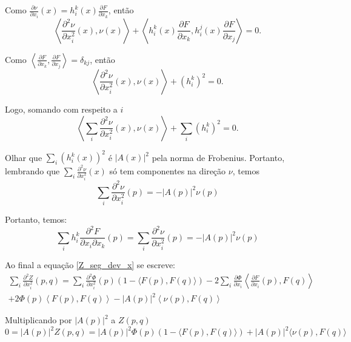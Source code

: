 \begin{demonstracao}
	Como $\frac{\partial \nu}{\partial x_i}(x) = h_i^k(x) \frac{\partial F}{\partial x_k}$, então
	\begin{equation*}
		\left\langle \frac{\partial^2 \nu}{\partial x_i^2}(x), \nu(x) \right\rangle + \left\langle h_i^k(x) \frac{\partial F}{\partial x_k}, h_i^j(x) \frac{\partial F}{\partial x_j}  \right\rangle = 0.
	\end{equation*}
	
	Como $\left\langle \frac{\partial F}{\partial x_k}, \frac{\partial F}{\partial x_j} \right\rangle = \delta_{kj}$, então
	\begin{equation*}
		\left\langle \frac{\partial^2 \nu}{\partial x_i^2}(x), \nu(x) \right\rangle + (h_i^k)^2 = 0.
	\end{equation*}
	
	Logo, somando com respeito a $i$
	\begin{equation*}
		\left\langle \sum_i \frac{\partial^2 \nu}{\partial x_i^2}(x), \nu(x) \right\rangle + \sum_i (h_i^k)^2 = 0.
	\end{equation*}
	
	Olhar que $\sum_i (h_i^k(x))^2$ é $| A(x) |^2$ pela norma de Frobenius. Portanto, lembrando que $\sum_i \frac{\partial^2 \nu}{\partial x_i^2}(x)$ só tem componentes na direção $\nu$, temos
	\begin{equation*}
		\sum_i \frac{\partial^2 \nu}{\partial x_i^2}(p) = - | A(p) |^2 \nu(p)
	\end{equation*}
	
	Portanto, temos:
	\begin{equation*}
		\sum_i h_i^k \frac{\partial^2 F}{\partial x_i \partial x_k}(p) = \sum_i \frac{\partial^2 \nu}{\partial x_i^2}(p) = - | A(p) |^2 \nu(p)
	\end{equation*}
	
	Ao final a equação \ref{Z_seg_dev_x} se escreve:
	\begin{multline}\label{lap_Z_x}
		\sum_i \frac{\partial^2 Z}{\partial x_i^2}(p,q) =  \sum_i \frac{\partial^2 \Phi}{\partial x_i^2}(p)(1 - \langle F(p), F(q) \rangle) -2  \sum_i \frac{\partial \Phi}{\partial x_i} \left\langle \frac{\partial F}{\partial x_i}(p), F(q) \right\rangle\\
		+ 2  \Phi(p) \left\langle F(p), F(q) \right\rangle - | A(p) |^2 \left\langle \nu(p), F(q) \right\rangle
	\end{multline}
	
	Multiplicando por $|A(p)|^2$ a $Z(p,q)$
	\begin{equation*}
		0 = |A(p)|^2 Z(p,q) = |A(p)|^2 \Phi(p) (1 - \langle F(p), F(q) \rangle) + |A(p)|^2 \langle \nu(p), F(q) \rangle
	\end{equation*}
	

\end{demonstracao}
